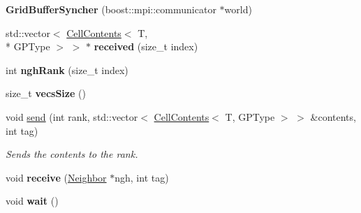 \begin{DoxyCompactItemize}
\item 
\hypertarget{classrepast_1_1_grid_buffer_syncher_aaf711d6b9a5f8b750bb38fc760ee7e65}{{\bfseries Grid\-Buffer\-Syncher} (boost\-::mpi\-::communicator $\ast$world)}\label{classrepast_1_1_grid_buffer_syncher_aaf711d6b9a5f8b750bb38fc760ee7e65}

\item 
\hypertarget{classrepast_1_1_grid_buffer_syncher_a5a88d5fff52263ed26570b802f4e2e52}{std\-::vector$<$ \hyperlink{classrepast_1_1_cell_contents}{Cell\-Contents}$<$ T, \\*
G\-P\-Type $>$ $>$ $\ast$ {\bfseries received} (size\-\_\-t index)}\label{classrepast_1_1_grid_buffer_syncher_a5a88d5fff52263ed26570b802f4e2e52}

\item 
\hypertarget{classrepast_1_1_grid_buffer_syncher_a3c75891d740c7ffdb106acd0c6a3e18a}{int {\bfseries ngh\-Rank} (size\-\_\-t index)}\label{classrepast_1_1_grid_buffer_syncher_a3c75891d740c7ffdb106acd0c6a3e18a}

\item 
\hypertarget{classrepast_1_1_grid_buffer_syncher_a1feaa3f70fc5db8ce2fccad2c5bee27c}{size\-\_\-t {\bfseries vecs\-Size} ()}\label{classrepast_1_1_grid_buffer_syncher_a1feaa3f70fc5db8ce2fccad2c5bee27c}

\item 
\hypertarget{classrepast_1_1_grid_buffer_syncher_a1a59baa51352a07463176273b1c95901}{void \hyperlink{classrepast_1_1_grid_buffer_syncher_a1a59baa51352a07463176273b1c95901}{send} (int rank, std\-::vector$<$ \hyperlink{classrepast_1_1_cell_contents}{Cell\-Contents}$<$ T, G\-P\-Type $>$ $>$ \&contents, int tag)}\label{classrepast_1_1_grid_buffer_syncher_a1a59baa51352a07463176273b1c95901}

\begin{DoxyCompactList}\small\item\em Sends the contents to the rank. \end{DoxyCompactList}\item 
\hypertarget{classrepast_1_1_grid_buffer_syncher_a2041ea31696f1c0922958f3f09e487b0}{void {\bfseries receive} (\hyperlink{classrepast_1_1_neighbor}{Neighbor} $\ast$ngh, int tag)}\label{classrepast_1_1_grid_buffer_syncher_a2041ea31696f1c0922958f3f09e487b0}

\item 
\hypertarget{classrepast_1_1_grid_buffer_syncher_a5e27b0d4c39471d000bcafb5e5c0fae4}{void {\bfseries wait} ()}\label{classrepast_1_1_grid_buffer_syncher_a5e27b0d4c39471d000bcafb5e5c0fae4}

\end{DoxyCompactItemize}


